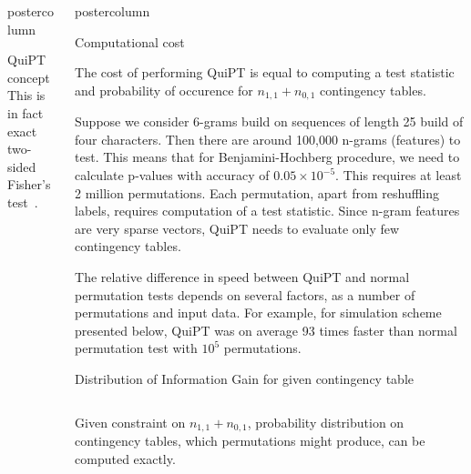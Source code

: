 \documentclass[final]{beamer}\usepackage[]{graphicx}\usepackage[]{color}
\newenvironment{knitrout}{}{} %
\newlength{\columnheight}
\begin{document}
\begin{frame}
\begin{columns}
\begin{column}{.47\textwidth}
\begin{beamercolorbox}[center,wd=\textwidth]{postercolumn}
\begin{minipage}[T]{.95\textwidth}
{\begin{block}{QuiPT concept}
This is in fact exact two-sided Fisher's test~\citep{lehmann1986testing}. 

\end{block}
\vfill 
    
    }
        \end{minipage}
      \end{beamercolorbox}
    \end{column}
    
    
    
    \begin{column}{.54\textwidth}
      \begin{beamercolorbox}[center,wd=\textwidth]{postercolumn}
        \begin{minipage}[T]{.95\textwidth}  
          \parbox[t][\columnheight]{\textwidth}
            {
     

 
\begin{block}{Computational cost}

The cost of performing QuiPT is equal to computing a test statistic and 
probability of occurence for $n_{1,1} + n_{0,1}$ contingency tables.

Suppose we consider 6-grams build on sequences of length 25 build of four 
characters. Then there are around 100,000 n-grams (features) to test. 
This means that for Benjamini-Hochberg procedure, we need to calculate 
p-values with accuracy of $0.05 \times 10^{-5}$. This requires at least 
2 million permutations. Each permutation, apart from reshuffling labels, 
requires computation of a test statistic. Since n-gram features are very sparse vectors, QuiPT needs to evaluate only few contingency tables.

The relative difference in speed between QuiPT and normal permutation tests depends on several factors, as a number of permutations and input data. For example, for simulation scheme presented below, QuiPT was on average 93 times faster than normal permutation test with $10^5$ permutations.

\end{block}
\vfill 
    
\begin{block}{Distribution of Information Gain for given contingency table}

\begin{columns}
\centering
Given constraint on $n_{1,1} + n_{0,1}$, probability distribution on
contingency tables, which permutations might produce, 
can be computed exactly.
\scalebox{0.79}{
\begin{knitrout}
\definecolor{shadecolor}{rgb}{0.969, 0.969, 0.969}\color{fgcolor}


\end{knitrout}}
\end{columns}
\end{block}}
\end{minipage}
\end{beamercolorbox}
\end{column}
\end{columns}
\end{frame}
\end{document}
